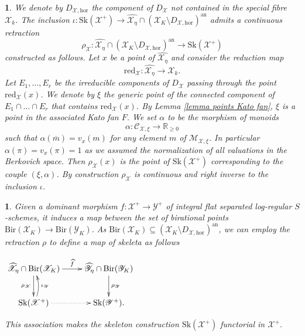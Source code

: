 \documentclass{amsart}%
\numberwithin{equation}{subsection}
\theoremstyle{plain2}
\theoremstyle{definition2}
\theoremstyle{stepstyle}
\theoremstyle{point}
\theoremstyle{subpoint}
\newtheorem{subpoint}[equation]{}%
\newcommand{\spa}[1]{\begin{subpoint}#1\end{subpoint}}           %
\newcommand{\R}{\ensuremath{\mathbb{R}}}
\newcommand{\cX}{\ensuremath{\mathscr{X}}}
\newcommand{\caM}{\ensuremath{\mathcal{M}}}
\newcommand{\caC}{\ensuremath{\mathcal{C}}}
\newcommand{\cY}{\ensuremath{\mathscr{Y}}}
\renewcommand{\R}{\ensuremath{\mathbb{R}}}
\renewcommand{\cY}{\ensuremath{\mathscr{Y}}}
\newcommand{\redu}{\mathrm{red}}
\newcommand{\an}{\mathrm{an}}
\newcommand{\Sk}{\mathrm{Sk}}
\begin{document}
\spa{We denote by $D_{\cX,\text{hor}}$ the component of $D_\cX$ not contained in the special fibre $\cX_k$. The inclusion $\iota: \Sk(\cX^+) \rightarrow \widehat{\cX_{\eta}} \cap (\cX_K \setminus D_{\cX, \text{hor}})^\an$ admits a continuous retraction $$\rho_\cX: \widehat{\cX_{\eta}} \cap (\cX_K \setminus D_{\cX, \text{hor}})^\an\rightarrow \Sk(\cX^+)$$ constructed as follows. Let $x$ be a point of $\widehat{\cX_{\eta}}$ and consider the reduction map $$\redu_{\cX}:\widehat{\cX_{\eta}} \rightarrow \cX_k.$$ Let $E_1, \ldots, E_r$ be the irreducible components of $D_\cX$ passing through the point $\redu_\cX(x)$. We denote by $\xi$ the generic point of the connected component of $E_1 \cap \ldots \cap E_r$ that contains $\redu_\cX(x)$. By Lemma \ref{lemma points Kato fan}, $\xi$ is a point in the associated Kato fan $F$. We set $\alpha$ to be the morphism of monoids $$\alpha: \caC_{\cX,\xi} \rightarrow \R_{\geqslant 0 }$$ such that $\alpha(\overline{m}) = v_x(m)$ for any element $m$ of $\caM_{\cX,\xi}$. In particular $\alpha(\pi)= v_x(\pi)=1$ as we assumed the normalization of all valuations in the Berkovich space. Then $\rho_\cX(x)$ is the point of $\Sk(\cX^+)$ corresponding to the couple $(\xi,\alpha)$. By construction $\rho_\cX$ is continuous and right inverse to the inclusion $\iota$. 
}
\spa{Given a dominant morphism $f: \cX^+ \rightarrow \cY^+$ of integral flat separated log-regular $S$-schemes, it induces a map between the set of birational points $\text{Bir}(\cX_K) \rightarrow \text{Bir}(\cY_K)$. As $\text{Bir}(\cX_K) \subseteq  (\cX_K \setminus D_{\cX, \text{hor}})^\an$, we can employ the retraction $\rho$ to define a map of skeleta as follows
\begin{center}
$\begin{gathered}
\xymatrixcolsep{2pc} \xymatrix{
 \widehat{\cX_{\eta}} \cap \text{Bir}(\cX_K) \ar[r]^-{\widehat{f}} \ar[d]_{\rho_\cX} & \widehat{\cY_{\eta}} \cap \text{Bir}(\cY_K) \ar[d]^{\rho_\cY}\\
  \Sk(\cX^+) \ar@{.>}[r]^{} \ar@/_/[u]_-{\iota_\cY}  & \Sk(\cY^+).
}
\end{gathered}$\end{center} This association makes the skeleton construction $\Sk(\cX^+)$ functorial in $\cX^+$.
}
\end{document}
